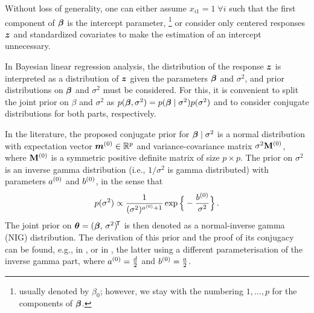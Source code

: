 Without loss of generality, one can either assume $x_{i1} = 1 \; \forall i$ such that
the first component of $\boldsymbol{\beta}$ is the intercept parameter,%
\footnote{usually denoted by $\beta_0$; however,
we stay with the numbering $1,\ldots, p$ for the components of $\boldsymbol{\beta}$.}
or consider only centered responses ${\bm z}$ and standardized covariates
to make the estimation of an intercept unnecessary.

In Bayesian linear regression analysis, the distribution of the response ${\bm z}$ is interpreted as
a distribution of ${\bm z}$ given the parameters $\boldsymbol{\beta}$ and $\sigma^2$, and %
prior distributions on $\boldsymbol{\beta}$ and $\sigma^2$ must be considered.
For this, it is convenient to split the joint prior on $\beta$ and $\sigma^2$ as %
$p(\boldsymbol{\beta},\sigma^2) = p(\boldsymbol{\beta}\mid\sigma^2) p(\sigma^2)$
and to consider conjugate distributions for both parts, respectively.


In the literature, the proposed conjugate prior for $\boldsymbol{\beta}\mid\sigma^2$
is a normal distribution with expectation vector ${\bm m}^{(0)} \in \mathbb{R}^p$ and variance-covariance
matrix $\sigma^2 \mathbf{M}^{(0)}$, where $\mathbf{M}^{(0)}$ is a symmetric positive definite matrix of
size $p \times p$. The prior on $\sigma^2$ is an inverse gamma distribution
(i.e., $1/\sigma^2$ is gamma distributed) with parameters $a^{(0)}$ and $b^{(0)}$, in the sense that
\begin{align*}
p(\sigma^2) \propto \frac{1}{(\sigma^2)^{a^{(0)} + 1}} \exp\Big\{ -\frac{b^{(0)}}{\sigma^2} \Big\}\,.
\end{align*}
The joint prior on $\boldsymbol{\theta} = (\boldsymbol{\beta},\, \sigma^2)^{{\mbox{\!\scriptsize\textsf{T}}}}$ is then denoted as a normal-inverse gamma (NIG) distribution.
The derivation of this prior and the proof of its
conjugacy can be found, e.g., in \textcite{2013:fahrmeier-kneib-lang-marx}, or in \textcite{1994:ohagan},
the latter using a different parameterisation of the inverse gamma part,
where $a^{(0)} = \frac{d}{2}$ and $b^{(0)} = \frac{a}{2}$.

